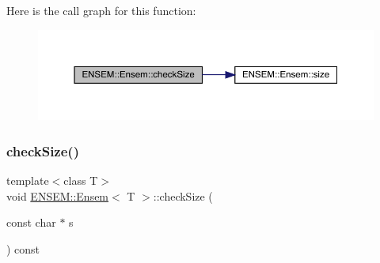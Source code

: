 Here is the call graph for this function\+:
\nopagebreak
\begin{figure}[H]
\begin{center}
\leavevmode
\includegraphics[width=350pt]{d7/d3e/classENSEM_1_1Ensem_a32978c0e251d9731bdb83c6069eb059d_cgraph}
\end{center}
\end{figure}
\mbox{\label{classENSEM_1_1Ensem_a32978c0e251d9731bdb83c6069eb059d}} 
\subsubsection{\texorpdfstring{checkSize()}{checkSize()}\hspace{0.1cm}{\footnotesize\ttfamily [2/4]}}
{\footnotesize\ttfamily template$<$class T$>$ \\
void \mbox{\hyperlink{classENSEM_1_1Ensem}{E\+N\+S\+E\+M\+::\+Ensem}}$<$ T $>$\+::check\+Size (\begin{DoxyParamCaption}\item[{const char $\ast$}]{s }\end{DoxyParamCaption}) const\hspace{0.3cm}{\ttfamily [inline]}}

